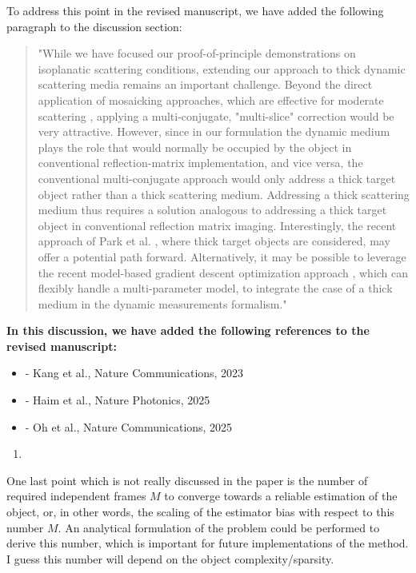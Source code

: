 \documentclass[12pt]{article}
\newenvironment{solved_reviewercomment}
    {\begin{tcolorbox}[width=\linewidth,colback=gray!5,colframe=solved_commentcolor!50,title=Reviewer Comment,left=5pt,right=5pt]}
    {\end{tcolorbox}}
\newenvironment{finished_ourresponse}
    {\begin{tcolorbox}[width=\linewidth,breakable,enhanced,colback=gray!5,colframe=finished_responsecolor!50,title=Response,left=5pt,right=5pt]}
    {\end{tcolorbox}}
\begin{document}
\begin{finished_ourresponse}
    To address this point in the revised manuscript, we have added the following paragraph to the discussion section:
    \begin{quote}
        "While we have focused our proof-of-principle demonstrations on isoplanatic scattering conditions, extending our approach to thick dynamic scattering media remains an important challenge. Beyond the direct application of mosaicking approaches, which are effective for moderate scattering \cite{lee22, najar2024harnessing}, applying a multi-conjugate, "multi-slice" correction \cite{kang2023tracing, haim2025image} would be very attractive. However, since in our formulation the dynamic medium plays the role that would normally be occupied by the object in conventional reflection-matrix implementation, and vice versa, the conventional multi-conjugate approach would only address a thick target object rather than a thick scattering medium. Addressing a thick scattering medium thus requires a solution analogous to addressing a thick target object in conventional reflection matrix imaging. Interestingly, the recent approach of Park et al. \cite{oh2025digital}, where thick target objects are considered, may offer a potential path forward. 
        Alternatively, it may be possible to leverage the recent model-based gradient descent optimization approach  \cite{haim2025image}, which can flexibly handle a multi-parameter model, to integrate the case of a thick medium in the dynamic measurements formalism."
    \end{quote}

    \textbf{In this discussion, we have added the following references to the revised manuscript:}
    \begin{itemize}[nosep]
    \item \cite{kang2023tracing} - Kang et al., Nature Communications, 2023
    \item \cite{haim2025image} - Haim et al., Nature Photonics, 2025
    \item \cite{oh2025digital} - Oh et al., Nature Communications, 2025
    \end{itemize}
    
\end{finished_ourresponse}

\begin{enumerate}[label=\arabic*., resume]
\item \leavevmode
\end{enumerate}
\vspace{-1em}
\begin{solved_reviewercomment}
    One last point which is not really discussed in the paper is the number of required independent frames \(M\) to converge towards a reliable estimation of the object, or, in other words, the scaling of the estimator bias with respect to this number \(M\). An analytical formulation of the problem could be performed to derive this number, which is important for future implementations of the method. I guess this number will depend on the object complexity/sparsity.
\end{solved_reviewercomment}
    
\end{document}

